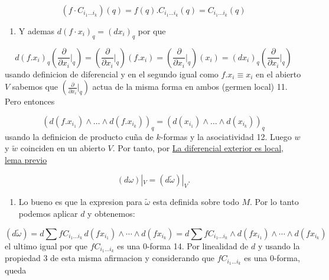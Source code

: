 \begin{bookproof}{}
\[
(f\cdot C_{i_1\ldots i_k})(q)=f(q).C_{i_1\ldots i_k}(q)=C_{i_1\ldots i_k}(q)
\]
\begin{enumerate}[start=10]
\item Y ademas $d(f\cdot x_i)_q=(dx_i)_q$ por que
\end{enumerate}
\[
d(f.x_{i})_{q}\left(\frac{\partial}{\partial x_{i}}\bigg|_{q}\right)=\left(\frac{\partial}{\partial x_{i}}\bigg|_{q}\right)(f.x_{i})=\left(\frac{\partial}{\partial x_{i}}\bigg|_{q}\right)(x_{i})=(dx_{i})_{q}\left(\frac{\partial}{\partial x_{i}}\bigg|_{q}\right)
\]
usando definicion de diferencial y en el segundo igual como $f.x_{i}\equiv x_{i}$ en el abierto $V$ sabemos que $\left(\frac{\partial}{\partial x_{i}}\bigg|_{q}\right)$ actua de la misma forma en ambos (germen local) 11. Pero entonces

\[
(d(f.x_{i_{1}})\wedge\ldots\wedge d(f.x_{i_{k}}))_{q}=(d(x_{i_{1}})\wedge\ldots\wedge d(x_{i_{k}}))_{q}
\]
usando la definicion de producto cuña de $k$-formas y la asociatividad 12. Luego $w$ y $\widetilde{w}$  coinciden en un abierto $V$. Por tanto, por \hyperref[blk:ef3cfa]{La diferencial exterior es local, lema previo}

\[
(d\omega)|_V=(d\widetilde\omega)|_V.
\]
\begin{enumerate}[start=13]
\item Lo bueno es que la expresion para $\widetilde\omega$ esta definida sobre todo $M$. Por lo tanto podemos aplicar $d$ y obtenemos:
\end{enumerate}
\[
(d\widetilde\omega)=d\sum fC_{i_1\ldots i_k}\,d(fx_{i_1})\wedge\cdots\wedge d(fx_{i_k})=d\sum fC_{i_1\ldots i_k}\wedge d(fx_{i_1})\wedge\cdots\wedge d(fx_{i_k})
\]
el ultimo igual por que $fC_{i_1\ldots i_k}$ es una $0$-forma 14. Por linealidad de $d$ y usando la propiedad $3$ de esta misma afirmacion y considerando que $fC_{i_1\ldots i_k}$ es una $0$-forma, queda


\end{bookproof}
